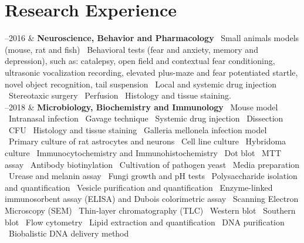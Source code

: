 \documentclass[11pt, a4paper]{article}
\newcommand{\LastName}{Colombo}
\newcommand{\Initials}{AC}
\newcommand{\Me}{\textbf{\LastName, \Initials}}  %
\newcommand{\Duration}[2]{\fontsize{10pt}{0}\selectfont #1--#2}
\begin{document}





\section*{Research Experience}

\begin{EntriesTable}
	
	\Duration{2010}{2016}  &
	\textbf{Neuroscience, Behavior and Pharmacology}
	\newline
	 \textbullet \ Small animals models (mouse, rat and fish) \textbullet \ Behavioral tests (fear and anxiety, memory and depression), such as: catalepsy, open field and contextual fear conditioning, ultrasonic vocalization recording, elevated plus-maze and fear potentiated startle, novel object recognition, tail suspension \textbullet \ Local and systemic drug injection \textbullet \ Stereotaxic surgery \textbullet \ Perfusion \textbullet \ Histology and tissue staining.
	\\
	
	\Duration{2014}{2018}  &
	\textbf{Microbiology, Biochemistry and Immunology}
	\newline
	\textbullet \ Mouse model \textbullet \ Intranasal infection \textbullet \ Gavage technique \textbullet \ Systemic drug injection \textbullet \ Dissection \textbullet \ CFU \textbullet \ Histology and tissue staining \textbullet \ Galleria mellonela infection model \textbullet \ Primary culture of rat astrocytes and neurons \textbullet \ Cell line culture \textbullet \ Hybridoma culture \textbullet \ Immunocytochemistry and Immunohistochemistry \textbullet \ Dot blot \textbullet \ MTT assay \textbullet \ Antibody biotinylation \textbullet \ Cultivation of pathogen yeast \textbullet \ Media preparation \textbullet \ Urease and melanin assay \textbullet \ Fungi growth and pH tests \textbullet \ Polysaccharide isolation and quantification \textbullet \ Vesicle purification and quantification \textbullet \ Enzyme-linked immunosorbent assay (ELISA) and Dubois colorimetric assay  \textbullet \ Scanning Electron Microscopy (SEM)  \textbullet \ Thin-layer chromatography (TLC) \textbullet \ Western blot \textbullet \ Southern blot \textbullet \ Flow cytometry \textbullet \ Lipid extraction and quantification \textbullet \ DNA purification  \textbullet \ Biobalistic DNA delivery method 
	\\

	
\end{EntriesTable}
\end{document}
